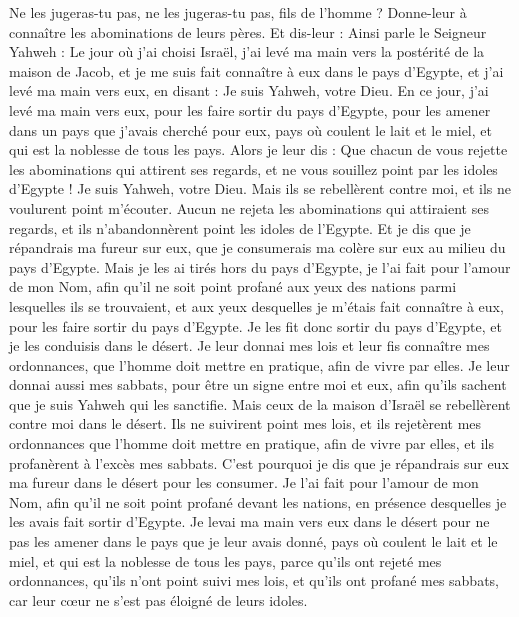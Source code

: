 \begin{multicols}{2}
Ne les jugeras-tu pas, ne les jugeras-tu pas, fils de l'homme ? Donne-leur à connaître les abominations de leurs pères.
Et dis-leur : Ainsi parle le Seigneur Yahweh : Le jour où j'ai choisi Israël, j'ai levé ma main vers la postérité de la maison de Jacob, et je me suis fait connaître à eux dans le pays d'Egypte, et j'ai levé ma main vers eux, en disant : Je suis Yahweh, votre Dieu.
En ce jour, j'ai levé ma main vers eux, pour les faire sortir du pays d'Egypte, pour les amener dans un pays que j'avais cherché pour eux, pays où coulent le lait et le miel, et qui est la noblesse de tous les pays.
Alors je leur dis : Que chacun de vous rejette les abominations qui attirent ses regards, et ne vous souillez point par les idoles d'Egypte ! Je suis Yahweh, votre Dieu.
Mais ils se rebellèrent contre moi, et ils ne voulurent point m'écouter. Aucun ne rejeta les abominations qui attiraient ses regards, et ils n'abandonnèrent point les idoles de l'Egypte. Et je dis que je répandrais ma fureur sur eux, que je consumerais ma colère sur eux au milieu du pays d'Egypte.
Mais je les ai tirés hors du pays d'Egypte, je l'ai fait pour l'amour de mon Nom, afin qu'il ne soit point profané aux yeux des nations parmi lesquelles ils se trouvaient, et aux yeux desquelles je m'étais fait connaître à eux, pour les faire sortir du pays d'Egypte.
Je les fit donc sortir du pays d'Egypte, et je les conduisis dans le désert.
Je leur donnai mes lois et leur fis connaître mes ordonnances, que l'homme doit mettre en pratique, afin de vivre par elles.
Je leur donnai aussi mes sabbats, pour être un signe entre moi et eux, afin qu'ils sachent que je suis Yahweh qui les sanctifie.
Mais ceux de la maison d'Israël se rebellèrent contre moi dans le désert. Ils ne suivirent point mes lois, et ils rejetèrent mes ordonnances que l'homme doit mettre en pratique, afin de vivre par elles, et ils profanèrent à l'excès mes sabbats. C'est pourquoi je dis que je répandrais sur eux ma fureur dans le désert pour les consumer.
Je l'ai fait pour l'amour de mon Nom, afin qu'il ne soit point profané devant les nations, en présence desquelles je les avais fait sortir d'Egypte.
Je levai ma main vers eux dans le désert pour ne pas les amener dans le pays que je leur avais donné, pays où coulent le lait et le miel, et qui est la noblesse de tous les pays,
parce qu'ils ont rejeté mes ordonnances, qu'ils n'ont point suivi mes lois, et qu'ils ont profané mes sabbats, car leur cœur ne s'est pas éloigné de leurs idoles.

\end{multicols}
